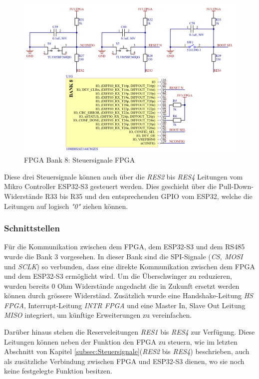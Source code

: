 \begin{figure}[H]
    \centering
    \includegraphics[width=1.0\linewidth]{Figures/Chap3/Schematics/Bank8_Admin.png}
    \caption{FPGA Bank 8: Steuersignale FPGA}
    \label{FPGA Admin}
\end{figure}

Diese drei Steuersignale können auch über die \textit{RES2} bis \textit{RES4} Leitungen vom Mikro Controller ESP32-S3 gesteuert werden. Dies geschieht über die Pull-Down-Widerstände R33 bis R35 und den entsprechenden GPIO vom ESP32, welche die Leitungen auf logisch \textit{"0"} ziehen können.

\subsubsection{Schnittstellen}
\label{subsubsec:Schnittstellen}
Für die Kommunikation zwischen dem FPGA, dem ESP32-S3 und dem RS485 wurde die Bank 3 vorgesehen. In dieser Bank sind die SPI-Signale (\textit{CS, MOSI} und \textit{SCLK}) so verbunden, dass eine direkte Kommunikation zwischen dem FPGA und dem ESP32-S3 ermöglicht wird. Um die Überschwinger zu reduzieren, wurden bereits 0 Ohm Widerstände angedacht die in Zukunft ersetzt werden können durch grössere Widerständ. Zusätzlich wurde eine Handshake-Leitung \textit{HS FPGA}, Interrupt-Leitung \textit{INTR FPGA} und eine Master In, Slave Out Leitung \textit{MISO} integriert, um künftige Erweiterungen zu vereinfachen.

Darüber hinaus stehen die Reserveleitungen \textit{RES1} bis \textit{RES4} zur Verfügung. Diese Leitungen können neben der Funktion den FPGA zu steuern, wie im letzten Abschnitt von Kapitel \ref{subsec:Steuersignale}(\textit{RES2} bis \textit{RES4}) beschrieben, auch als zusätzliche Verbindung zwischen FPGA und ESP32-S3 dienen, wo sie noch keine festgelegte Funktion besitzen.

